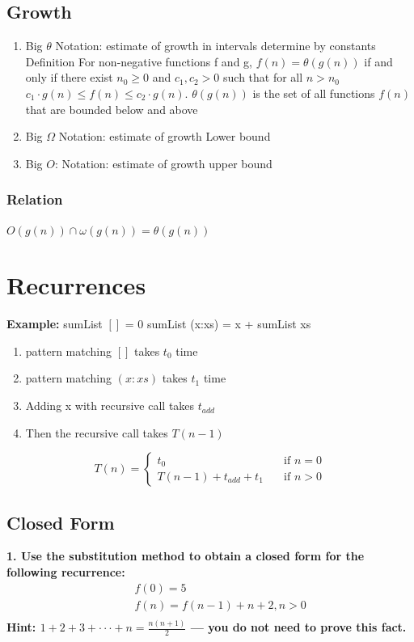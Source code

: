 \subsection{Growth}
\begin{enumerate}
\item Big $ \theta $ Notation: estimate of growth in intervals determine by constants
  Definition
  For non-negative functions f and g, $f (n) = \theta (g (n))$ if and only if there
  exist $ n_0 \geq 0 $ and $ c_1 , c_2 > 0 $ such that for all $ n > n_0 $
  $ c_1 \cdot g (n) \leq f (n) \leq c_2 \cdot g (n) $.
  $ \theta (g (n)) $ is the set of all functions $ f(n) $ that are bounded below and above
\item Big $ \Omega $ Notation: estimate of growth Lower bound
\item Big $ O $: Notation: estimate of growth upper bound
\end{enumerate}


\subsubsection{Relation}
$O(g(n)) \cap \omega (g(n)) = \theta (g(n))$



\section{Recurrences}
\noindent\textbf{Example:} \newline
sumList $[]$ = 0 \newline
sumList (x:xs) = x + sumList xs

\begin{enumerate}
\item pattern matching $[]$ takes $t_0$ time
\item pattern matching $(x:xs)$ takes $t_1$ time
\item Adding x with recursive call takes $t_{add}$
\item Then the recursive call takes $T(n-1)$
\end{enumerate}

\[ T(n) =
  \begin{cases}
    t_0                   & \quad \text{if } n = 0 \\
    T(n-1)+t_{add} +t_{1}  & \quad \text{if } n > 0 
  \end{cases}
\]

\newpage

\subsection{Closed Form}
\noindent\textbf{1. Use the substitution method to obtain a closed form for the following recurrence:}
\begin{align*}
  &\quad  f(0) = 5 \\
  &\quad  f(n) = f(n -1) + n + 2, n> 0 \\
\end{align*}
\textbf{Hint: $1 + 2 + 3 + · · · + n = \frac{n(n+1)}{2}$ — you do not need to prove this fact.}


